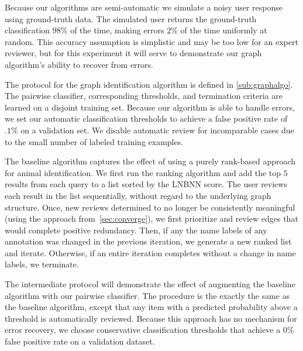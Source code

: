     Because our algorithms are semi-automatic we simulate a noisy user response using ground-truth data.
    The simulated user returns the ground-truth classification $98\percent$ of the time, making errors
      $2\percent$ of the time uniformly at random.
    This accuracy assumption is simplistic and may be too low for an expert reviewer, but for this experiment it
      will serve to demonstrate our graph algorithm's ability to recover from errors.

    The protocol for the graph identification algorithm is defined in \cref{sub:graphalgo}.
    The pairwise classifier, corresponding thresholds, and termination criteria are learned on a disjoint
      training set.
    Because our algorithm is able to handle errors, we set our automatic classification thresholds to achieve a
      false positive rate of $.1\percent$ on a validation set.
    We disable automatic review for incomparable cases due to the small number of labeled training examples.

    The baseline algorithm captures the effect of using a purely rank-based approach for animal identification.
    We first run the ranking algorithm and add the top $5$ results from each query to a list sorted by the LNBNN
      score.
    The user reviews each result in the list sequentially, without regard to the underlying graph structure.
    Once, new reviews determined to no longer be consistently meaningful (using the approach
      from~\cref{sec:converge}), we first prioritize and review edges that would complete positive redundancy.
    Then, if any the name labels of any annotation was changed in the previous iteration, we generate a new
      ranked list and iterate.
    Otherwise, if an entire iteration completes without a change in name labels, we terminate.

    The intermediate protocol will demonstrate the effect of augmenting the baseline algorithm with our pairwise
      classifier.
    The procedure is the exactly the same as the baseline algorithm, except that any item with a predicted
      probability above a threshold is automatically reviewed.
    Because this approach has no mechanism for error recovery, we choose conservative classification thresholds
      that achieve a $0\percent$ false positive rate on a validation dataset.

    \begin{comment}
    python -m ibeis Chap5.print_measures --db GZ_Master1 --diskshow
    \end{comment}

